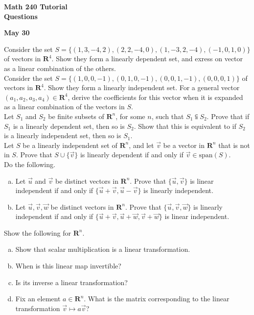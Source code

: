 \documentclass[a4paper,11pt]{article}
\newcommand{\R}{\mathbf{R}}
\begin{document}
\begin{center}
  {\Large\bfseries Math 240 Tutorial \\ Questions}
\end{center}
\begin{center}
  {\bfseries May 30}
\end{center}

 Consider the set
$S=\{(1,3,-4,2),(2,2,-4,0),(1,-3,2,-4),(-1,0,1,0)\}$ of vectors in $\R^4$. Show
they form a linearly dependent set, and exress on vector as a linear combination
of the others. \\

 Consider the set
$S=\{(1,0,0,-1),(0,1,0,-1),(0,0,1,-1),(0,0,0,1)\}$ of vectors in $\R^4$. Show
they form a linearly independent set. For a general vector $(a_1,a_2,a_3,a_4)
\in \R^4$, derive the coefficients for this vector when it is expanded as a
linear combination of the vectors in $S$. \\

 Let $S_1$ and $S_2$ be finite subsets of $\R^n$,
for some $n$, such that $S_1 \subseteqq S_2$. Prove that if $S_1$ is a linearly
dependent set, then so is $S_2$. Show that this is equivalent to if $S_2$ is a
linearly independent set, then so is $S_1$. \\

 Let $S$ be a linearly independent set of $\R^n$,
and let $\vec v$ be a vector in $\R^n$ that is not in $S$. Prove that $S \cup
\{\vec v\}$ is linearly dependent if and only if $\vec v \in \text{span}(S)$. \\

 Do the following.
\begin{enumerate}[(a)]
\item Let $\vec u$ and $\vec v$ be distinct vectors in $\R^n$. Prove that
  $\{\vec u, \vec v\}$ is linear independent if and only if $\{\vec u + \vec v,
  \vec u - \vec v\}$ is linearly independent.
\item Let $\vec u, \vec v, \vec w$ be distinct vectors in $\R^n$. Prove that
  $\{\vec u, \vec v, \vec w\}$ is linearly independent if and only if $\{\vec
  u+\vec v,\vec u+\vec w,\vec v+\vec w\}$ is linear independent. \\
\end{enumerate}

 Show the following for $\R^n$.
\begin{enumerate}[(a)]
\item Show that scalar multiplication is a linear transformation.
\item When is this linear map invertible?
\item Is its inverse a linear transformation?
\item Fix an element $a \in \R^n$. What is the matrix corresponding to the
linear transformation $\vec v \mapsto a\vec v$? \\
\end{enumerate}
\end{document}
